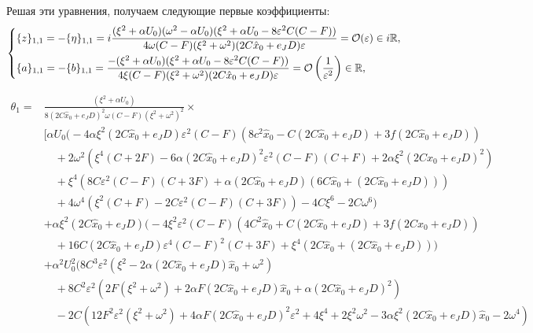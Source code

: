 Решая эти уравнения, получаем следующие первые коэффициенты:
\begin{equation*}
\begin{dcases}
\{z\}_{1,1} = - \{\eta\}_{1,1} = i \frac{(\xi^2+\alpha U_0)(\omega^2-\alpha U_0)(\xi^2 + \alpha U_0 - 8 \varepsilon^2 C (C-F))}{4\omega(C-F)(\xi^2+\omega^2)(2C \hat x_0 + e_J D) \varepsilon} = \mathcal{O}(\varepsilon) \in i \mathbb{R},\\
\{a\}_{1,1} = - \{b\}_{1,1} = \frac{-(\xi^2+\alpha U_0)(\xi^2 + \alpha U_0 - 8 \varepsilon^2 C (C-F))}{4\xi(C-F)(\xi^2+\omega^2)(2C \hat x_0 + e_J D) \varepsilon} = \mathcal{O} \left(\frac{1}{\varepsilon^2} \right) \in \mathbb{R},
\end{dcases}
\end{equation*}

\begin{equation*}
\begin{split}
\theta_1 = &\frac{\left(\xi ^2+\alpha U_0\right)}{8 (2C \hat x_0 + e_J D)^2 \omega (C-F) \left(\xi ^2+\omega ^2\right)^2} \times \\
&\Bigg[
\alpha U_0 \bigg(-4 \alpha \xi ^2 (2C \hat x_0 + e_J D) \varepsilon ^2 (C-F) \left(8 c^2 \hat x_0-C (2C \hat x_0 + e_J D)+3 f (2C \hat x_0 + e_J D)\right) \\
&\quad +2 \omega ^2 \left(\xi ^4 (C+2 F)-6 \alpha (2C \hat x_0 + e_J D)^2 \varepsilon ^2 (C-F) (C+F)+2 \alpha \xi ^2 (2C \hat x_0 + e_J D)^2\right) \\
&\quad +\xi ^4 \left(8 C \varepsilon ^2 (C-F) (C+3 F)+\alpha (2C \hat x_0 + e_J D) (6 C \hat x_0+(2C \hat x_0 + e_J D))\right) \\
&\quad +4 \omega ^4 \left(\xi ^2 (C+F)-2 C \varepsilon ^2 (C-F) (C+3 F)\right)-4 C \xi ^6-2 C \omega ^6\bigg) \\
&+\alpha \xi ^2 (2C \hat x_0 + e_J D) \bigg(-4 \xi ^2 \varepsilon ^2 (C-F) \left(4 C^2 \hat x_0+C (2C \hat x_0 + e_J D)+3 f (2C \hat x_0 + e_J D)\right) \\
&\quad +16 C (2C \hat x_0 + e_J D) \varepsilon ^4 (C-F)^2 (C+3 F)+\xi ^4 (2 C \hat x_0+(2C \hat x_0 + e_J D))\bigg) \\
&+\alpha ^2 U_0^2 \bigg(8 C^3 \varepsilon ^2 \left(\xi ^2-2 \alpha (2C \hat x_0 + e_J D) \hat x_0+\omega ^2\right) \\
&\quad +8 C^2 \varepsilon ^2 \left(2 F \left(\xi ^2+\omega ^2\right)+2 \alpha F (2C \hat x_0 + e_J D) \hat x_0+\alpha (2C \hat x_0 + e_J D)^2\right) \\
&\quad -2 C \left(12 F^2 \varepsilon ^2 \left(\xi ^2+\omega ^2\right)+4 \alpha F (2C \hat x_0 + e_J D)^2 \varepsilon ^2+4 \xi ^4+2 \xi ^2 \omega ^2-3 \alpha \xi ^2 (2C \hat x_0 + e_J D) \hat x_0-2 \omega ^4\right) \\

\end{split}
\end{equation*}
